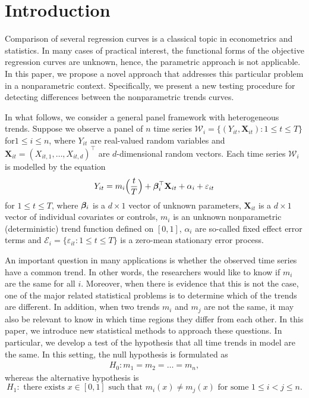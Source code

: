 \documentclass[a4paper,12pt]{article}
\makeatletter
\renewcommand{\eqref}[1]{\tagform@{\ref{#1}}}
\makeatother
\begin{document}
%


\section{Introduction}\label{sec:intro}

Comparison of several regression curves is a classical topic in econometrics and statistics. In many cases of practical interest, the functional forms of the objective regression curves are unknown, hence, the parametric approach is not applicable. In this paper, we propose a novel approach that addresses this particular problem in a nonparametric context. Specifically, we present a new testing procedure for detecting differences between the nonparametric trends curves. 

In what follows, we consider a general panel framework with heterogeneous trends. Suppose we observe a panel of $n$ time series $\mathcal{W}_i = \{ (Y_{it},\mathbf{X}_{it}): 1 \le t \le T \}$ for\linebreak $1 \le i \le n$, where $Y_{it}$ are real-valued random variables and $\mathbf{X}_{it} = (X_{it,1},\ldots,X_{it,d})^\top$ are $d$-dimensional random vectors. Each time series $\mathcal{W}_i$ is modelled by the equation
\begin{equation}\label{eq:model}
Y_{it} = m_i \Big( \frac{t}{T} \Big) + \bm{\beta}_i^\top \mathbf{X}_{it} + \alpha_i + \varepsilon_{it}
\end{equation}
for $1 \le t \le T$, where $\bm{\beta}_i$ is a $d \times 1$ vector of unknown parameters, $\mathbf{X}_{it}$ is a $d\times 1$ vector of individual covariates or controls, $m_i$ is an unknown nonparametric (deterministic) trend function defined on $[0,1]$, $\alpha_i$ are so-called fixed effect error terms and \linebreak $\mathcal{E}_i = \{ \varepsilon_{it}: 1 \le t \le T \}$ is a zero-mean stationary error process. 


An important question in many applications is whether the observed time series have a common trend. In other words, the researchers would like to know if $m_i$ are the same for all $i$. Moreover, when there is evidence that this is not the case, one of the major related statistical problems is to determine which of the trends are different.%
In addition, when two trends $m_i$ and $m_j$ are not the same, it may also be relevant to know in which time regions they differ from each other. In this paper, we introduce new statistical methods to approach these questions. In particular, we develop a test of the hypothesis that all time trends in model \eqref{eq:model} are the same. In this setting, the null hypothesis is formulated as 
\begin{align}\label{eq:null}
H_0: m_1 = m_2 = \ldots = m_n,
\end{align}
whereas the alternative hypothesis is 
$$H_1: \text{ there exists } x\in [0, 1] \text{ such that } m_i (x) \neq m_j(x) \text{ for some } 1\leq i < j \leq n.$$
\end{document}
